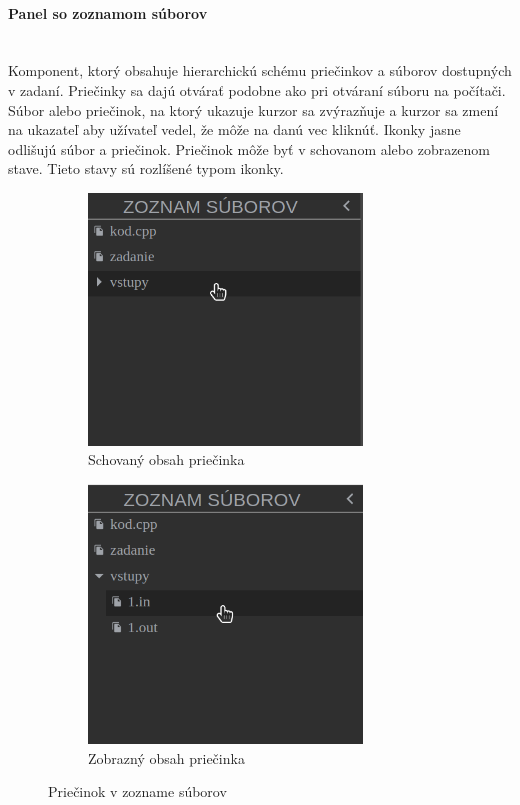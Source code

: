 \paragraph{Panel so zoznamom súborov}\leavevmode\\
Komponent, ktorý obsahuje hierarchickú schému priečinkov a súborov dostupných v zadaní. Priečinky sa
dajú otvárať podobne ako pri otváraní súboru na počítači. Súbor alebo priečinok, na ktorý ukazuje
kurzor sa zvýrazňuje a kurzor sa zmení na ukazateľ aby užívateľ vedel, že môže na danú vec kliknúť.
Ikonky jasne odlišujú súbor a priečinok. Priečinok môže byť v schovanom alebo zobrazenom stave. 
Tieto stavy sú rozlíšené typom ikonky.
\begin{figure}[H]
\centering
\begin{subfigure}{.5\textwidth}
  \centering
  \includegraphics[width=0.8\textwidth]{images/schovany_zoznam}
  \caption[Schovaný obsah priečinka]{Schovaný obsah priečinka}
  \label{obr:schovany_zoznam}
\end{subfigure}%
\begin{subfigure}{.5\textwidth}
  \centering
  \includegraphics[width=0.8\textwidth]{images/zobrazeny_zoznam}
  \caption[Zobrazný obsah priečinka]{Zobrazný obsah priečinka}
  \label{obr:zobrazeny_zoznam}
\end{subfigure}
\caption{Priečinok v zozname súborov}
\end{figure}

